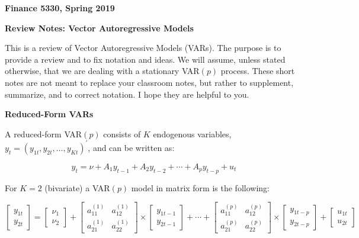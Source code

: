 \documentclass[11pt]{article}
\begin{document}
\pagestyle{empty}

\textbf{Finance 5330, Spring 2019}

\vspace{3.5mm}

\textbf{Review Notes: Vector Autoregressive Models}
\vspace{3.5mm}


This is a review of Vector Autoregressive Models (VARs).  The purpose is to
provide a review and to fix notation and ideas. We will assume, unless 
stated otherwise, that we are dealing with a stationary VAR$(p)$ process. These
short notes are not meant to replace your classroom notes, but rather to supplement,
summarize, and to correct notation.  I hope they are helpful to you.

\vspace{10mm}
\textbf{Reduced-Form VARs}

\vspace{3.5mm}
A reduced-form VAR$(p)$ consists of $K$ endogenous variables, 
$y_{t} = (y_{1t}, y_{2t}, \ldots, y_{Kt})^{\prime}$, and can be written as:

\begin{equation*}
y_{t} = \nu + A_{1} y_{t-1} + A_{2} y_{t-2} + \cdots + A_{p} y_{t-p} + u_{t}
\end{equation*} 

\vspace{3.5mm}
For $K=2$ (bivariate) a VAR$(p)$ model in matrix form is the following:

\vspace{3mm}
\begin{equation*}
\left[ \begin{array}{c} y_{1t} \\ y_{2t} \end{array} \right] = \left[\begin{array}{c} \nu_{1} \\ \nu_{2} \end{array}\right]
+ \begin{bmatrix} a_{11}^{(1)} & a_{12}^{(1)} \\ a_{21}^{(1)} & a_{22}^{(1)} \end{bmatrix} \times 
\left[\begin{array}{c} y_{1t-1} \\ y_{2t-1} \end{array} \right] + 
\cdots + 
\begin{bmatrix} a_{11}^{(p)} & a_{12}^{(p)} \\ a_{21}^{(p)} & a_{22}^{(p)} \end{bmatrix} \times
\left[\begin{array}{c} y_{1t-p} \\ y_{2t-p} \end{array} \right] +  
\left[\begin{array}{c} u_{1t} \\ u_{2t} \end{array} \right]
\end{equation*}
\end{document}
